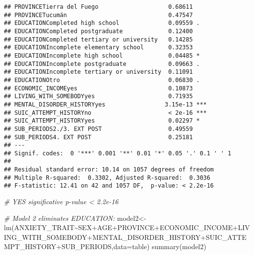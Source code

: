 \documentclass[
]{book}
\newenvironment{Shaded}{\begin{snugshade}}{\end{snugshade}}
\newcommand{\AttributeTok}[1]{\textcolor[rgb]{0.77,0.63,0.00}{#1}}
\newcommand{\CommentTok}[1]{\textcolor[rgb]{0.56,0.35,0.01}{\textit{#1}}}
\newcommand{\FunctionTok}[1]{\textcolor[rgb]{0.00,0.00,0.00}{#1}}
\newcommand{\NormalTok}[1]{#1}
\newcommand{\OtherTok}[1]{\textcolor[rgb]{0.56,0.35,0.01}{#1}}
\newcommand{\SpecialCharTok}[1]{\textcolor[rgb]{0.00,0.00,0.00}{#1}}
\begin{document}
\begin{verbatim}
## PROVINCETierra del Fuego                    0.68611    
## PROVINCETucumán                             0.47547    
## EDUCATIONCompleted high school              0.09559 .  
## EDUCATIONCompleted postgraduate             0.12400    
## EDUCATIONCompleted tertiary or university   0.14285    
## EDUCATIONIncomplete elementary school       0.32353    
## EDUCATIONIncomplete high school             0.04485 *  
## EDUCATIONIncomplete postgraduate            0.09663 .  
## EDUCATIONIncomplete tertiary or university  0.11091    
## EDUCATIONOtro                               0.06830 .  
## ECONOMIC_INCOMEyes                          0.10873    
## LIVING_WITH_SOMEBODYyes                     0.71935    
## MENTAL_DISORDER_HISTORYyes                 3.15e-13 ***
## SUIC_ATTEMPT_HISTORYno                      < 2e-16 ***
## SUIC_ATTEMPT_HISTORYyes                     0.02297 *  
## SUB_PERIODS2./3. EXT POST                   0.49559    
## SUB_PERIODS4. EXT POST                      0.25181    
## ---
## Signif. codes:  0 '***' 0.001 '**' 0.01 '*' 0.05 '.' 0.1 ' ' 1
## 
## Residual standard error: 10.14 on 1057 degrees of freedom
## Multiple R-squared:  0.3302, Adjusted R-squared:  0.3036 
## F-statistic: 12.41 on 42 and 1057 DF,  p-value: < 2.2e-16
\end{verbatim}

\begin{Shaded}
\begin{Highlighting}[]
\CommentTok{\# YES significative p{-}value \textless{} 2.2e{-}16}

\CommentTok{\# Model 2 eliminates EDUCATION:}
\NormalTok{model2}\OtherTok{\textless{}{-}}\FunctionTok{lm}\NormalTok{(ANXIETY\_TRAIT}\SpecialCharTok{\textasciitilde{}}\NormalTok{SEX}\SpecialCharTok{+}\NormalTok{AGE}\SpecialCharTok{+}\NormalTok{PROVINCE}\SpecialCharTok{+}\NormalTok{ECONOMIC\_INCOME}\SpecialCharTok{+}\NormalTok{LIVING\_WITH\_SOMEBODY}\SpecialCharTok{+}\NormalTok{MENTAL\_DISORDER\_HISTORY}\SpecialCharTok{+}\NormalTok{SUIC\_ATTEMPT\_HISTORY}\SpecialCharTok{+}\NormalTok{SUB\_PERIODS,}\AttributeTok{data=}\NormalTok{table)}
\FunctionTok{summary}\NormalTok{(model2)}
\end{Highlighting}
\end{Shaded}
\end{document}
